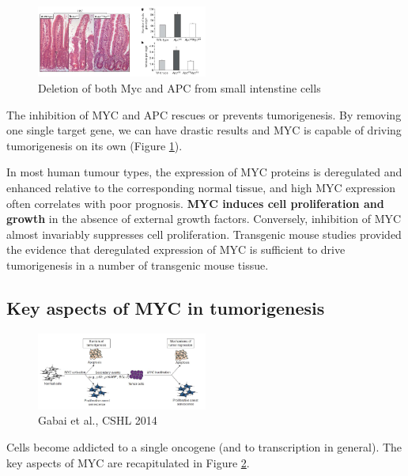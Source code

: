 \begin{figure}
\centering
\includegraphics[width=0.5\textwidth]{../_resources/641af477cb65d73954e1ae24aab9a2ed.png}
\caption{Deletion of both Myc and APC from small intenstine cells}
\label{fig:inhi}
\end{figure}

The inhibition of MYC and APC rescues or prevents tumorigenesis. By removing one single target gene, we can have drastic results and MYC is capable of driving tumorigenesis on its own (Figure \ref{fig:inhi}).

In most human tumour types, the expression of MYC proteins is deregulated and enhanced relative to the corresponding normal tissue, and high MYC expression often correlates with poor prognosis. \textbf{MYC induces cell proliferation and growth} in the absence of external growth factors. Conversely, inhibition of MYC almost invariably suppresses cell proliferation.
Transgenic mouse studies provided the evidence that deregulated expression of MYC is sufficient to drive tumorigenesis in a number of transgenic mouse tissue.

\hypertarget{key-aspect-of-myc-in-tumorigenesis}{%
\subsection{Key aspects of MYC in tumorigenesis}\label{key-aspect-of-myc-in-tumorigenesis}}

\begin{figure}
\centering
\includegraphics[width=0.5\textwidth]{../_resources/18345a0e70ca9e50883ca61f93ad3405.png}
\caption{Gabai et al., CSHL 2014}
\label{fig:key}
\end{figure}

Cells become addicted to a single oncogene (and to transcription in general). The key aspects of MYC are recapitulated in Figure \ref{fig:key}.

